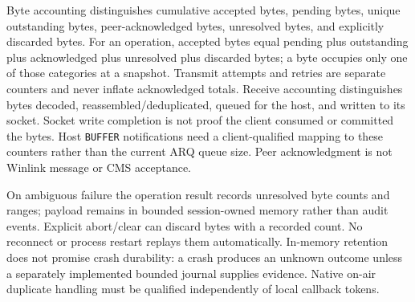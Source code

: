 Byte accounting distinguishes cumulative accepted bytes, pending bytes,
unique outstanding bytes, peer-acknowledged bytes, unresolved bytes, and
explicitly discarded bytes. For an operation, accepted bytes equal pending
plus outstanding plus acknowledged plus unresolved plus discarded bytes;
a byte occupies only one of those categories at a snapshot. Transmit attempts
and retries are separate counters and never inflate acknowledged totals.
Receive accounting distinguishes bytes decoded, reassembled/deduplicated,
queued for the host, and written to its socket. Socket write completion is
not proof the client consumed or committed the bytes. Host \texttt{BUFFER}
notifications need a client-qualified mapping to these counters rather than
the current ARQ queue size. Peer acknowledgment is not Winlink message or
CMS acceptance.

On ambiguous failure the operation result records unresolved byte counts and
ranges; payload remains in bounded session-owned memory rather than audit
events. Explicit abort/clear can discard bytes with a recorded count. No reconnect
or process restart replays them automatically. In-memory retention does not
promise crash durability: a crash produces an unknown outcome unless a
separately implemented bounded journal supplies evidence. Native on-air
duplicate handling must be qualified independently of local callback tokens.

